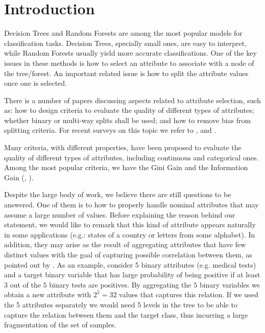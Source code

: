 \newpage

\chapter{Introduction}
\label{chap:introduction}

Decision Trees and Random Forests are among the most popular 
models for classification tasks. Decision Trees, specially small ones, are easy to interpret,
while Random Forests usually yield more accurate classifications. One of the key issues in these methods
is how to select an attribute to associate with a node of the tree/forest. An important
related issue is how to split the attribute values once one is selected.

There is a number of papers  discussing aspects related to 
attribute selection, such as:
how to design criteria to evaluate the quality of different types of attributes;
whether binary or multi-way splits shall be used; and
how to remove bias from  splitting criteria.
For recent surveys on this topic we refer to \cite{books/sp/datamining2005/RokachM05},
\cite{Loh2014} and \cite{series/sbcs/BarrosCF15}.

Many criteria, with different properties,  have been proposed to evaluate 
the quality of different types of attributes, including
continuous and categorical ones.  Among the most popular criteria,
we have the Gini Gain and the Information Gain (\cite{Breiman84}, \cite{quinlan2014c4}).

Despite the large body of work, we believe  there are still questions to be answered.
One of them is to how to  properly handle nominal  attributes that may assume a large number of values.
Before explaining the reason behind our  statement, we would
like to remark that this kind of attribute
appears naturally in some applications  (e.g.: states of a country or letters from some alphabet).
In addition, they may arise as the result of aggregating
attributes that have few distinct values
with the goal of capturing possible correlation between them, as pointed out by \cite{Chou:91}.
As an example, consider 5 binary attributes (e.g. medical tests) and a
target binary variable  that has large probability of being positive if at least $3$ out
of the $5$ binary tests are positives. By aggregating
the $5$ binary variables we obtain a new attribute with $2^5=32$
values that  captures  this relation. 
If we used the 5 attributes separately we would 
need 5 levels in the tree to be able to capture the relation between
them and the target class, thus 
incurring a large fragmentation of the set of samples.

